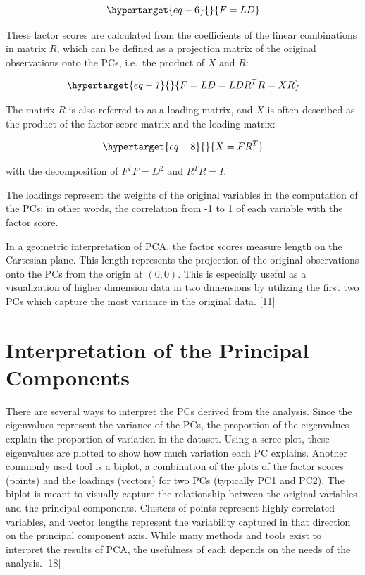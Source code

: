 \documentclass[
  letterpaper,
  DIV=11,
  numbers=noendperiod]{scrreprt}
\begin{document}
\begin{equation}\protect\hypertarget{eq-6}{}{
F = LD
}\label{eq-6}\end{equation}

These factor scores are calculated from the coefficients of the linear
combinations in matrix \(R\), which can be defined as a projection
matrix of the original observations onto the PCs, i.e.~the product of
\(X\) and \(R\):

\begin{equation}\protect\hypertarget{eq-7}{}{
F = LD = LDR^TR = XR
}\label{eq-7}\end{equation}

The matrix \(R\) is also referred to as a loading matrix, and \(X\) is
often described as the product of the factor score matrix and the
loading matrix:

\begin{equation}\protect\hypertarget{eq-8}{}{
X = FR^T
}\label{eq-8}\end{equation}

with the decomposition of \(F^TF = D^2\) and \(R^TR = I\).

The loadings represent the weights of the original variables in the
computation of the PCs; in other words, the correlation from -1 to 1 of
each variable with the factor score.

In a geometric interpretation of PCA, the factor scores measure length
on the Cartesian plane. This length represents the projection of the
original observations onto the PCs from the origin at \((0, 0)\). This
is especially useful as a visualization of higher dimension data in two
dimensions by utilizing the first two PCs which capture the most
variance in the original data. {[}11{]}

\hypertarget{interpretation-of-the-principal-components}{%
\section{Interpretation of the Principal
Components}\label{interpretation-of-the-principal-components}}

There are several ways to interpret the PCs derived from the analysis.
Since the eigenvalues represent the variance of the PCs, the proportion
of the eigenvalues explain the proportion of variation in the dataset.
Using a scree plot, these eigenvalues are plotted to show how much
variation each PC explains. Another commonly used tool is a biplot, a
combination of the plots of the factor scores (points) and the loadings
(vectors) for two PCs (typically PC1 and PC2). The biplot is meant to
visually capture the relationship between the original variables and the
principal components. Clusters of points represent highly correlated
variables, and vector lengths represent the variability captured in that
direction on the principal component axis. While many methods and tools
exist to interpret the results of PCA, the usefulness of each depends on
the needs of the analysis. {[}18{]}
\end{document}
